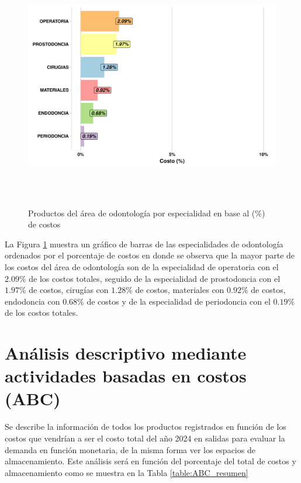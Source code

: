\begin{figure}[H]
  \caption{Productos del área de odontología por especialidad en base al ($\%$) de costos}
  {\includegraphics[width=15cm, height=10cm]{images/odonto_prod.pdf}}
  \label{fig:Odonto_espec}
\end{figure}

La Figura \ref{fig:Odonto_espec} muestra un gráfico de barras de las especialidades de odontología ordenados por el porcentaje de costos en donde se observa que la mayor parte de los costos del área de odontología son de la especialidad de operatoria con el $2.09\%$ de los costos totales, seguido de la especialidad de prostodoncia con el $1.97\%$ de costos, cirugías con $1.28\%$ de costos, materiales con $0.92\%$ de costos, endodoncia con $0.68\%$ de costos y de la especialidad de periodoncia con el $0.19\%$ de los costos totales.

\newpage

\section{Análisis descriptivo mediante actividades basadas en costos (ABC)}

Se describe la información de todos los productos registrados en función de los costos que vendrían a ser el costo total del año 2024 en salidas para evaluar la demanda en función monetaria, de la misma forma ver los espacios de almacenamiento. Este análisis será en función del porcentaje del total de costos y almacenamiento como se muestra en la Tabla \ref{table:ABC_resumen}

